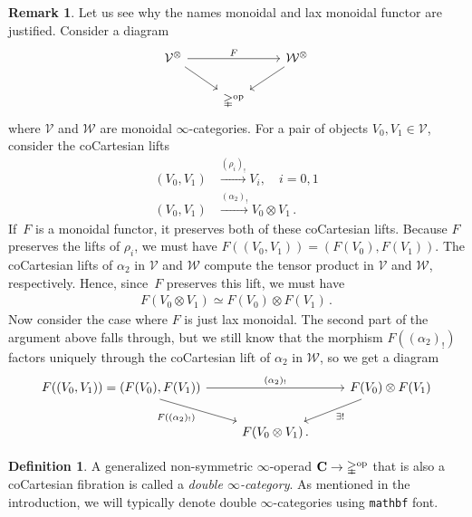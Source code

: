 \documentclass[10pt]{amsart}
\numberwithin{equation}{section}
\theoremstyle{definition}
\newtheorem{definition}[prop]{Definition}
\newtheorem{rem}[prop]{Remark}
\DeclareMathOperator{\op}{op}
\newcommand{\Simp}{\mathbb{\Delta}}
\newcommand{\cV}{\mathcal{V}}
\newcommand{\cW}{\mathcal{W}}
\newcommand{\bfC}{\mathbf{C}}
\renewcommand{\to}{\mathchoice{\longrightarrow}{\rightarrow}{}{}}
\begin{document}
	\begin{rem}\label{rem:unwinding_monoidal_functor}
		Let us see why the names monoidal and lax monoidal functor are justified.
		Consider a diagram
		\begin{equation*}
			\begin{tikzcd}
				\cV^{\otimes} \arrow[rr, "F"] \arrow[dr] && \cW^{\otimes} \arrow[dl] \\
				& \Simp^{\op}&
			\end{tikzcd}
		\end{equation*}
		where $\cV$ and $\cW$ are monoidal $\infty$-categories.
		For a pair of objects $V_0, V_1 \in \cV$, consider the coCartesian lifts
		\begin{align*}
			(V_0,V_1) & \xrightarrow{(\rho_{i})_{!}} V_i, \quad i=0,1 \\
			(V_0,V_1) &\xrightarrow{(\alpha_2)_!} V_0\otimes V_1 \,.
		\end{align*}
		If~$F$ is a monoidal functor, it preserves both of these coCartesian lifts.
		Because $F$ preserves the lifts of $\rho_{i}$, we must have $F( (V_0, V_1)) = (F(V_0), F(V_1))$.
		The coCartesian lifts of $\alpha_2$ in $\cV$ and $\cW$ compute the tensor product in $\cV$ and $\cW$, respectively.
		Hence, since~$F$ preserves this lift, we must have
		\begin{align*}
			F(V_0 \otimes V_1) \simeq F(V_0) \otimes F(V_1) \,.
		\end{align*}
		Now consider the case where $F$ is just lax monoidal.
		The second part of the argument above falls through, but we still know  that the morphism $F\left( (\alpha_2)_! \right)$ factors uniquely through the coCartesian lift of $\alpha_2$ in $\cW$, so we get a diagram
		\begin{equation*}
			\begin{tikzcd}
				F( (V_0, V_{1}) ) = ( F(V_0), F(V_1)) \arrow[dr, "F( (\alpha_2)_! )"']\arrow[rr, "(\alpha_2)_{!}"] & & F(V_0) \otimes F(V_1)  \arrow[dl, "\exists !"] \\
				& F(V_0 \otimes V_1)\,. &
			\end{tikzcd}
		\end{equation*}
	\end{rem}

	\begin{definition} \label{def:double_cat}
		A generalized non-symmetric $\infty$-operad $\bfC\to \Simp^{\op}$ that is also a coCartesian fibration is called a \emph{double $\infty$-category}.
		As mentioned in the introduction, we will typically denote double $\infty$-categories using \texttt{mathbf} font.
	\end{definition}
\end{document}

